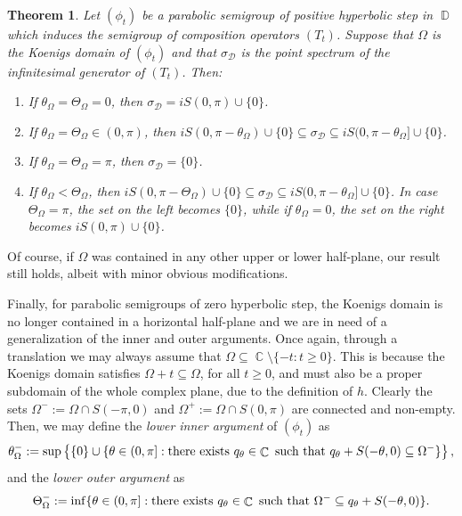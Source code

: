 \documentclass[11pt]{amsart}
\numberwithin{equation}{section}
\newtheorem{theorem}{Theorem}[section]
\theoremstyle{definition}
\DeclareMathOperator{\C}{\mathbb{C}}
\DeclareMathOperator{\D}{\mathbb{D}}
\begin{document}
	\begin{theorem}\label{thm:intro phs dirichlet}
		Let $(\phi_t)$ be a parabolic semigroup of positive hyperbolic step in $\D$ which induces the semigroup of composition operators $(T_t)$. Suppose that $\Omega$ is the Koenigs domain of $(\phi_t)$ and that $\sigma_\mathcal{D}$ is the point spectrum of the infinitesimal generator of $(T_t)$. Then:
		\begin{enumerate}
			\item[\textup{(a)}] If $\theta_\Omega=\Theta_\Omega=0$, then $\sigma_\mathcal{D}=iS(0,\pi)\cup\{0\}$.
			\item[\textup{(b)}] If $\theta_\Omega=\Theta_\Omega\in(0,\pi)$, then $iS(0,\pi-\theta_\Omega)\cup\{0\}\subseteq\sigma_\mathcal{D}\subseteq iS(0,\pi-\theta_\Omega]\cup\{0\}$.
			\item[\textup{(c)}] If $\theta_\Omega=\Theta_\Omega=\pi$, then $\sigma_\mathcal{D}=\{0\}$.
			\item[\textup{(d)}] If $\theta_\Omega<\Theta_\Omega$, then $iS(0,\pi-\Theta_\Omega)\cup\{0\}\subseteq\sigma_\mathcal{D}\subseteq iS(0,\pi-\theta_\Omega]\cup\{0\}$. In case $\Theta_\Omega=\pi$, the set on the left becomes $\{0\}$, while if $\theta_\Omega=0$, the set on the right becomes $iS(0,\pi)\cup\{0\}$.
		\end{enumerate}
	\end{theorem}
	Of course, if $\Omega$ was contained in any other upper or lower half-plane, our result still holds, albeit with minor obvious modifications.
	
	Finally, for parabolic semigroups of zero hyperbolic step, the Koenigs domain is no longer contained in a horizontal half-plane and we are in need of a generalization of the inner and outer arguments. Once again, through a translation we may always assume that $\Omega\subseteq\C\setminus\{-t:t\ge0\}$. This is because the Koenigs domain satisfies $\Omega+t\subseteq\Omega$, for all $t\ge0$, and must also be a proper subdomain of the whole complex plane, due to the definition of $h$. Clearly the sets $\Omega^-:=\Omega\cap S(-\pi,0)$ and $\Omega^+:=\Omega\cap S(0,\pi)$ are connected and non-empty. Then, we may define the \textit{lower inner argument} of $(\phi_t)$ as
	\begin{equation}\label{eq:lower inner argument}
		\theta_\Omega^-:=\sup\left\{\{0\}\cup\{\theta\in(0,\pi]:\textup{there exists }q_\theta\in\C \textup{ such that }q_\theta+S(-\theta,0)\subseteq\Omega^-\}\right\},
	\end{equation}
	and the \textit{lower outer argument} as
	\begin{equation}\label{eq:lower outer argument}
		\Theta_\Omega^-:=\inf\{\theta\in(0,\pi]:\textup{there exists }q_\theta\in\C \textup{ such that }\Omega^-\subseteq q_\theta+S(-\theta,0)\}.
	\end{equation}
	
\end{document}
